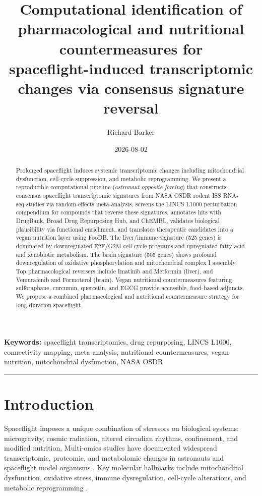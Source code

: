 \documentclass[11pt,a4paper]{article}
\title{Computational identification of pharmacological and nutritional countermeasures for \\
       spaceflight-induced transcriptomic changes via consensus signature reversal}
\author[1]{Richard Barker}
\affil[1]{Collaborative Science Environment Inc.}
\date{2026-08-02}
\begin{document}
\maketitle

\begin{abstract}
Prolonged spaceflight induces systemic transcriptomic changes including mitochondrial dysfunction, 
cell-cycle suppression, and metabolic reprogramming. We present a reproducible computational pipeline 
(\textit{astronaut-opposite-forcing}) that constructs consensus spaceflight transcriptomic signatures 
from NASA OSDR rodent ISS RNA-seq studies via random-effects meta-analysis, screens the LINCS L1000 
perturbation compendium for compounds that reverse these signatures, annotates hits with DrugBank, 
Broad Drug Repurposing Hub, and ChEMBL, validates biological plausibility via functional enrichment, 
and translates therapeutic candidates into a vegan nutrition layer using FooDB. The liver/immune 
signature (525 genes) is dominated by downregulated E2F/G2M 
cell-cycle programs and upregulated fatty acid and xenobiotic metabolism. The brain signature 
(505 genes) shows profound downregulation of oxidative 
phosphorylation and mitochondrial complex I assembly. Top pharmacological reversers include Imatinib 
and Metformin (liver), and Vemurafenib and Formoterol (brain). Vegan nutritional countermeasures 
featuring sulforaphane, curcumin, quercetin, and EGCG provide accessible, food-based adjuncts. 
We propose a combined pharmacological and nutritional countermeasure strategy for long-duration 
spaceflight.
\end{abstract}

\noindent\textbf{Keywords:} spaceflight transcriptomics, drug repurposing, LINCS L1000, connectivity 
mapping, meta-analysis, nutritional countermeasures, vegan nutrition, mitochondrial dysfunction, 
NASA OSDR

\bigskip
\hrule
\bigskip

\section{Introduction}

Spaceflight imposes a unique combination of stressors on biological systems: microgravity, cosmic 
radiation, altered circadian rhythms, confinement, and modified nutrition. Multi-omics studies have 
documented widespread transcriptomic, proteomic, and metabolomic changes in astronauts and spaceflight 
model organisms \citep{garrett2019nasa, beheshti2019multi}. Key molecular hallmarks include 
mitochondrial dysfunction, oxidative stress, immune dysregulation, cell-cycle alterations, and 
metabolic reprogramming \citep{garrett2019nasa}.
\end{document}
